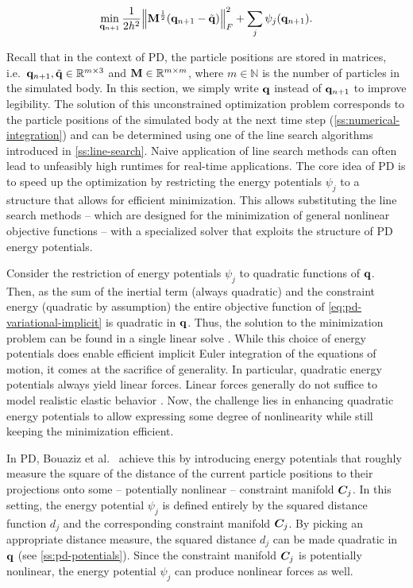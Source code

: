 \begin{equation}\label{eq:pd-variational-implicit}
    \min_{\mathbf{q}_{n+1}} \frac{1}{2h^2} \norm{\mathbf{M}^{\frac{1}{2}}(\mathbf{q}_{n+1} - \tilde{\mathbf{q}})}^2_F + \sum_j \psi_j(\mathbf{q}_{n+1}).
\end{equation}

\noindent Recall that in the context of PD, the particle positions are stored in matrices, i.e.\ $\mathbf{q}_{n+1}, \tilde{\mathbf{q}} \in 
\mathbb{R}^{m \times 3}$ and $\mathbf{M} \in \mathbb{R}^{m \times m}$, where $m \in \mathbb{N}$ is the number of particles in the simulated
body. In this section, we simply write $\mathbf{q}$ instead of $\mathbf{q}_{n+1}$ to improve legibility. The solution of this unconstrained 
optimization problem corresponds to the particle positions of the simulated body at the next time
step (\cref{ss:numerical-integration}) and can be determined using one of the line search algorithms introduced in \cref{ss:line-search}.
Naive application of line search methods can often lead to unfeasibly high runtimes for real-time applications. The core idea of PD
is to speed up the optimization by restricting the energy potentials $\psi_j$ to a structure that allows for efficient minimization.
This allows substituting the line search methods -- which are designed for the minimization of general nonlinear objective functions 
-- with a specialized solver that exploits the structure of PD energy potentials. 

Consider the restriction of energy potentials $\psi_j$ to quadratic functions of $\mathbf{q}$. Then, as the sum of the inertial term 
(always quadratic) and the constraint energy (quadratic by assumption) the entire objective function of \autoref{eq:pd-variational-implicit} 
is quadratic in $\mathbf{q}$. Thus, the solution to the minimization problem can be found in a single linear solve \cite{nocedal2006}. 
While this choice
of energy potentials does enable efficient implicit Euler integration of the equations of motion, it comes at the sacrifice of generality.
In particular, quadratic energy potentials always yield linear forces. Linear forces generally do not suffice to model realistic
elastic behavior \cite{wang2011}. Now, the challenge lies in enhancing quadratic energy potentials to allow expressing some degree
of nonlinearity while still keeping the minimization efficient. 

In PD, Bouaziz et al.\ \cite{bouaziz2014} achieve this by introducing energy potentials that roughly measure the square of the
distance of the current particle positions to their projections onto some -- potentially nonlinear -- constraint manifold $\bm{C}_j$. 
In this setting, the energy potential $\psi_j$ is defined entirely by the squared distance function $d_j$ and the corresponding constraint 
manifold $\bm{C}_j$. By picking an appropriate distance measure, the squared distance $d_j$ can be made quadratic in $\mathbf{q}$ 
(see \cref{ss:pd-potentials}). Since the constraint manifold $\bm{C}_j$ is potentially nonlinear, the energy potential 
$\psi_j$ can produce nonlinear forces as well. 

